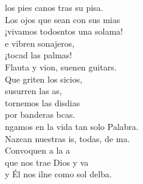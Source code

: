 \begin{cancion}
	los pies canos tras su pisa.\\
	Los ojos que sean con sus mias\\
	¡vivamos todosntos una solama!\\
	e vibren sonajeros, \\
¡tocad las palmas!\\
	Flauta y vion, suenen guitars.\\
	Que griten los sicios, \\
	susurren las as,\\
	tornemos las disdias\\
	por banderas bcas.\\
	ngamos en la vida tan solo Palabra.\\
	Nazcan nuestras is, todas, de ma.\\
	Convoquen a la a\\
	que nos trae Dios y va\\
	y Él nos ilne como sol delba.\\
\end{cancion}%
